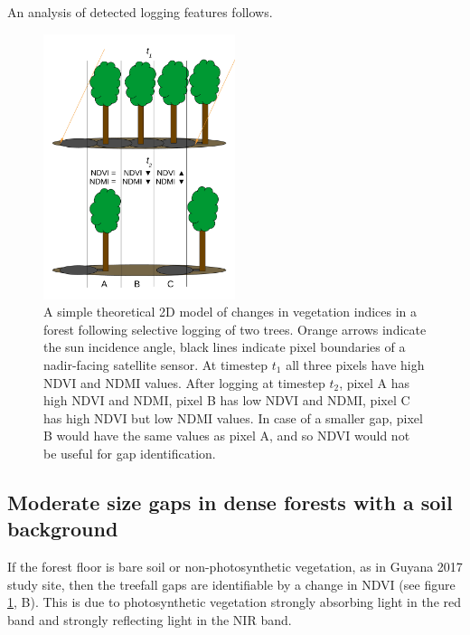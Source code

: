 \documentclass[a4paper,12pt]{scrbook}
\begin{document}
An analysis of detected logging features follows.

\begin{figure}
  \centering
  \includegraphics[width=0.5\textwidth]{thesis-figures/15-gap-vi-model}
  \caption{A simple theoretical 2D model of changes in vegetation indices in a forest following selective logging of two trees. Orange arrows indicate the sun incidence angle, black lines indicate pixel boundaries of a nadir-facing satellite sensor. At timestep $ t_{1} $ all three pixels have high \ac{NDVI} and \ac{NDMI} values. After logging at timestep $ t_{2} $, pixel A has high \ac{NDVI} and \ac{NDMI}, pixel B has low \ac{NDVI} and \ac{NDMI}, pixel C has high \ac{NDVI} but low \ac{NDMI} values. In case of a smaller gap, pixel B would have the same values as pixel A, and so \ac{NDVI} would not be useful for gap identification.}
  \label{fig-gap-vi-model}
\end{figure}

\subsection{Moderate size gaps in dense forests with a soil background}


If the forest floor is bare soil or non-photosynthetic vegetation, as in Guyana 2017 study site, then the treefall gaps are identifiable by a change in \ac{NDVI} (see figure \ref{fig-gap-vi-model}, B). This is due to photosynthetic vegetation strongly absorbing light in the red band and strongly reflecting light in the \ac{NIR} band.
\end{document}
